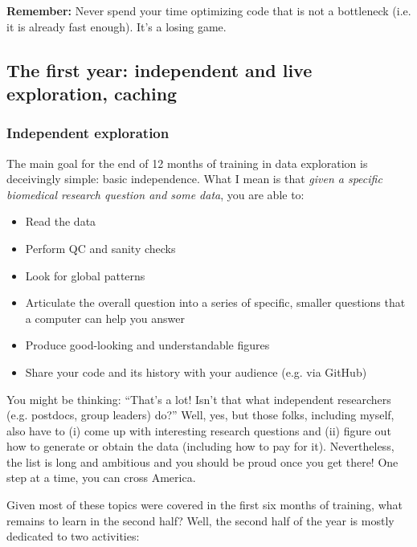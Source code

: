 \documentclass[12pt,a4paper,notitlepage,onecolumn]{article}
\begin{document}
\noindent
\textbf{Remember:} Never spend your time optimizing code that is not a bottleneck (i.e. it is already fast enough). It's a losing game. 

\subsection{The first year: independent and live exploration, caching}
\subsubsection{Independent exploration}
The main goal for the end of 12 months of training in data exploration is deceivingly simple: basic independence. What I mean is that \textit{given a specific biomedical research question and some data}, you are able to:

\begin{itemize}
\item Read the data
\item Perform QC and sanity checks
\item Look for global patterns
\item Articulate the overall question into a series of specific, smaller questions that a computer can help you answer
\item Produce good-looking and understandable figures
\item Share your code and its history with your audience (e.g. via GitHub)
\end{itemize}

You might be thinking: ``That's a lot! Isn't that what independent researchers (e.g. postdocs, group leaders) do?'' Well, yes, but those folks, including myself, also have to (i) come up with interesting research questions and (ii) figure out how to generate or obtain the data (including how to pay for it). Nevertheless, the list is long and ambitious and you should be proud once you get there! One step at a time, you can cross America.

Given most of these topics were covered in the first six months of training, what remains to learn in the second half? Well, the second half of the year is mostly dedicated to two activities:
\end{document}
